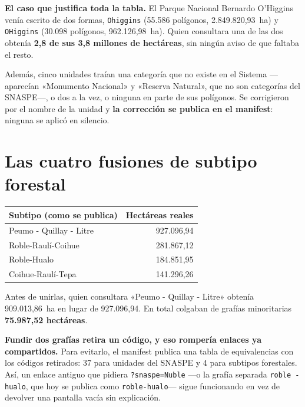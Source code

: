 \documentclass[11pt,a4paper]{report}
\newcommand{\campo}[1]{\textcolor{conaf}{\textbf{#1}}}
\newcommand{\orig}[1]{\texttt{\small #1}}
\begin{document}
\begin{alerta}
\campo{El caso que justifica toda la tabla.} El Parque Nacional Bernardo
O'Higgins venía escrito de dos formas, \orig{Ohiggins} (55.586 polígonos,
2.849.820,93~ha) y \orig{OHiggins} (30.098 polígonos, 962.126,98~ha). Quien
consultara una de las dos obtenía \textbf{2,8 de sus 3,8 millones de
hectáreas}, sin ningún aviso de que faltaba el resto.
\end{alerta}

Además, cinco unidades traían una categoría que no existe en el Sistema
—aparecían «Monumento Nacional» y «Reserva Natural», que no son categorías del
SNASPE—, o dos a la vez, o ninguna en parte de sus polígonos. Se corrigieron por
el nombre de la unidad y
\campo{la corrección se publica en el manifest}: ninguna se aplicó en silencio.

\section{Las cuatro fusiones de subtipo forestal}

\begin{center}
\begin{tabular}{@{}L{5.4cm} r@{}}
\toprule
\textbf{Subtipo (como se publica)} & \textbf{Hectáreas reales}\\
\midrule
Peumo - Quillay - Litre & 927.096,94\\
Roble-Raulí-Coihue & 281.867,12\\
Roble-Hualo & 184.851,95\\
Coihue-Raulí-Tepa & 141.296,26\\
\bottomrule
\end{tabular}
\end{center}

Antes de unirlas, quien consultara «Peumo - Quillay - Litre» obtenía
909.013,86~ha en lugar de 927.096,94. En total colgaban de grafías minoritarias
\textbf{75.987,52 hectáreas}.

\begin{nota}
\campo{Fundir dos grafías retira un código, y eso rompería enlaces ya
compartidos.} Para evitarlo, el manifest publica una tabla de equivalencias con
los códigos retirados: 37 para unidades del SNASPE y 4 para subtipos forestales.
Así, un enlace antiguo que pidiera \orig{?snaspe=Nuble} —o la grafía separada
\orig{roble - hualo}, que hoy se publica como \orig{roble-hualo}— sigue
funcionando en vez de devolver una pantalla vacía sin explicación.
\end{nota}
\end{document}
